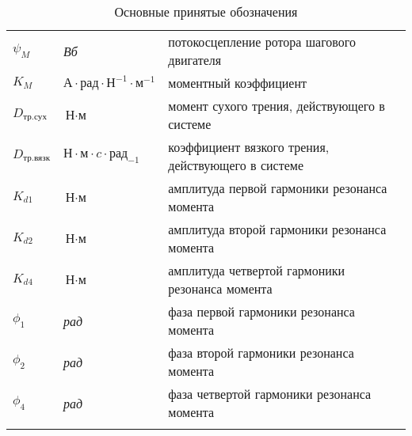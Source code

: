 \begin{longtabu}{X[-1,r]X[-1,l]X[l]}
    $\psi_{M}$                      & \textit{Вб}                               & потокосцепление ротора шагового двигателя \\

    $K_{M}$                         & $\textit{А} \cdot \textit{рад} \cdot \textit{Н}^{-1} \cdot \textit{м}^{-1}$ & моментный коэффициент \\

    $D_{\textit{тр.сух}}$           & $\textit{Н} \cdot \textit{м}$             & момент сухого трения, действующего в системе \\

    $D_{\textit{тр.вязк}}$          & $\textit{Н} \cdot \textit{м} \cdot \textit{c} \cdot \textit{рад}_{-1}$ & коэффициент вязкого трения, действующего в системе \\

    $K_{d1}$                        & $\textit{Н} \cdot \textit{м}$             & амплитуда первой гармоники резонанса момента \\

    $K_{d2}$                        & $\textit{Н} \cdot \textit{м}$             & амплитуда второй гармоники резонанса момента \\

    $K_{d4}$                        & $\textit{Н} \cdot \textit{м}$             & амплитуда четвертой гармоники резонанса момента \\

    $\phi_{1}$                      & \textit{рад}                              & фаза первой гармоники резонанса момента \\

    $\phi_{2}$                      & \textit{рад}                              & фаза второй гармоники резонанса момента \\

    $\phi_{4}$                      & \textit{рад}                              & фаза четвертой гармоники резонанса момента \\

    \caption{Основные принятые обозначения}
\end{longtabu}

